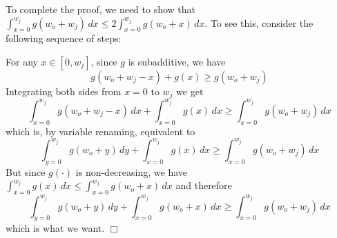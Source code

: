 \documentclass[11pt]{article}
\newenvironment{proofof}[1]{\smallskip\noindent{\bf Proof of #1:}}{\hspace*{\fill}$\Box$\par}
\begin{document}
\begin{proofof}{Lemma~\ref{lem:concave-arrival}}
\medskip \noindent To complete the proof, we need to show that $\int_{x=0}^{w_j} g(w_o + w_j) \,dx \leq 2 \int_{x=0}^{w_j} g(w_o + x) \,dx$. To see this, consider the following sequence of steps:

For any $x \in [0, w_j]$, since $g$ is subadditive, we have
$$
g(w_o + w_j - x) + g(x) \geq g(w_o + w_j)
$$
Integrating both sides from $x = 0$ to $w_j$ we get
$$
\int_{x = 0}^{w_j} g(w_o + w_j - x) \,dx  + \int_{x=0}^{w_j} g(x) \,dx \geq \int_{x = 0}^{w_j} g(w_o + w_j) \,dx
$$
which is, by variable renaming, equivalent to
$$
\int_{y = 0}^{w_j} g(w_o + y) \,dy  + \int_{x=0}^{w_j} g(x) \,dx \geq \int_{x = 0}^{w_j} g(w_o + w_j) \,dx
$$
But since $g(\cdot)$ is non-decreasing, we have $\int_{x=0}^{w_j} g(x) \,dx \leq \int_{x=0}^{w_j} g(w_o + x) \,dx$ and therefore
$$
\int_{y = 0}^{w_j} g(w_o + y) \,dy  + \int_{x=0}^{w_j} g(w_o + x) \,dx \geq \int_{x = 0}^{w_j} g(w_o + w_j) \,dx
$$
which is what we want.
\end{proofof}
\end{document}
